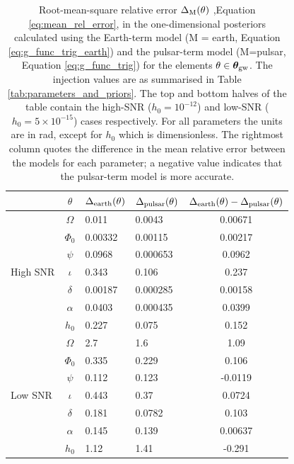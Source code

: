 \documentclass[fleqn,usenatbib,useAMS]{mnras}
\begin{document}
\begin{table}
	\centering
		\begin{tabular}{lcllc}
			\toprule
			&$\theta$ & $\Delta_{\rm earth}(\theta)$ & $\Delta_{\rm pulsar}(\theta)$ & $\Delta_{\rm earth}(\theta) - \Delta_{\rm pulsar}(\theta)$   \\
			\hline
			\multirow{7}{2mm}{High SNR} & $\Omega$       & 0.011& 0.0043& 0.00671\\
			& $\Phi_0$ &0.00332 &0.00115 &0.00217\\
			& $\psi$ &0.0968 &0.000653 &0.0962 \\
			& $\iota$ & 0.343 &0.106 &0.237 \\
			& $\delta$ & 0.00187 &0.000285 &0.00158 \\
			&$\alpha$ &0.0403 &0.000435 &0.0399 \\
			&$h_0$ & 0.227 &0.075 &0.152 \\
			\hline
			\multirow{7}{2mm}{Low SNR} & $\Omega$       & 2.7 &1.6& 1.09 \\
			& $\Phi_0$ &0.335 &0.229 &0.106 \\
			& $\psi$ &0.112 &0.123 &-0.0119 \\
			& $\iota$ & 0.443 &0.37 &0.0724 \\
			& $\delta$ & 0.181 &0.0782 &0.103 \\
			&$\alpha$ &0.145 &0.139 &0.00637 \\
			&$h_0$ & 1.12 &1.41 &-0.291 \\
			
			\bottomrule
		\end{tabular}
		\caption{Root-mean-square relative error $\Delta_{\rm M}(\theta)$ ,Equation \eqref{eq:mean_rel_error}, in the one-dimensional posteriors calculated using the Earth-term model (M = earth, Equation \eqref{eq:g_func_trig_earth}) and the pulsar-term model (M=pulsar, Equation \eqref{eq:g_func_trig}) for the elements $\theta \in \boldsymbol{\theta}_{\rm gw}$. The injection values are as summarised in Table \ref{tab:parameters_and_priors}. The top and bottom halves of the table contain the high-SNR ($h_0 = 10^{-12}$) and low-SNR ($h_0 = 5 \times 10^{-15}$) cases respectively.  For all parameters the units are in rad, except for $h_0$ which is dimensionless. The rightmost column quotes the difference in the mean relative error between the models for each parameter; a negative value indicates that the pulsar-term model is more accurate.}
		\label{tab:posterior_errors}
	\end{table}
\end{document}
